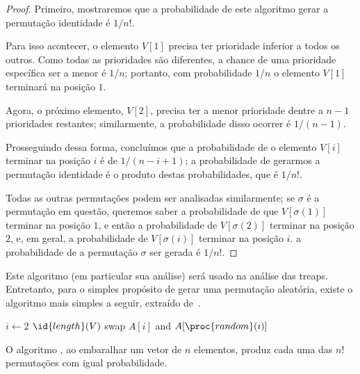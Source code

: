\begin{proof}
    Primeiro, mostraremos que a probabilidade de este algoritmo
    gerar a permutação identidade é $1/n!$.

    Para isso acontecer,
    o elemento $V[1]$ precisa ter prioridade inferior a todos os outros.
    Como todas as prioridades são diferentes,
    a chance de uma prioridade específica ser a menor é $1/n$;
    portanto, com probabilidade $1/n$ o elemento $V[1]$ terminará na posição $1$.

    Agora, o próximo elemento, $V[2]$,
    precisa ter a menor prioridade dentre a $n-1$ prioridades restantes;
    similarmente, a probabilidade disso ocorrer é $1/(n-1)$.

    Prosseguindo dessa forma,
    concluímos que a probabilidade de o elemento $V[i]$ terminar na posição $i$
    é de $1/(n-i+1)$;
    a probabilidade de gerarmos a permutação identidade
    é o produto destas probabilidades, que é $1/n!$.

    Todas as outras permutações podem ser analisadas similarmente;
    se $\sigma$ é a permutação em questão,
    queremos saber a probabilidade de que $V[\sigma(1)]$ terminar na posição $1$,
    e então a probabilidade de $V[\sigma(2)]$ terminar na posição $2$,
    e, em geral, a probabilidade de $V[\sigma(i)]$ terminar na posição $i$.
    a probabilidade de a permutação $\sigma$ ser gerada é $1/n!$.
\end{proof}

Este algoritmo
(em particular sua análise)
será usado na análise das treaps.
Entretanto, para o simples propósito de gerar uma permutação aleatória,
existe o algoritmo mais simples a seguir,
extraído de~\cite[p.~357]{SedgewickFlajolet2013}.

\begin{codebox}
    \li \For $i \gets 2$ \To $\id{length}(V)$
    \li \Do
            swap $A[i]$ and $A[\proc{random}(i)]$
    \End
\end{codebox}

\begin{proposition}
    O algoritmo ,
    ao embaralhar um vetor de $n$ elementos,
    produz cada uma das $n!$ permutações
    com igual probabilidade.
\end{proposition}

